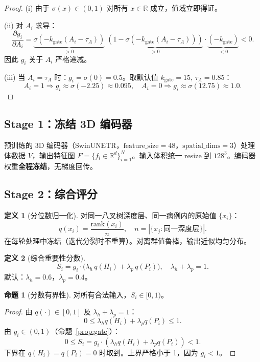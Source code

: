 \documentclass[11pt,a4paper]{article}
\newcommand{\RR}{\mathbb{R}}
\newcommand{\sigmoid}{\sigma}
\theoremstyle{definition}
\newtheorem{definition}{定义}[section]
\newtheorem{proposition}{命题}[section]
\begin{document}
\begin{proof}
(i) 由于 $\sigmoid(x) \in (0,1)$ 对所有 $x \in \RR$ 成立，值域立即得证。

(ii) 对 $A_i$ 求导：
\begin{equation}
\frac{\partial g_i}{\partial A_i}
= \underbrace{\sigmoid(-k_{\mathrm{gate}}(A_i-\tau_A))}_{>0}\;
  \underbrace{(1 - \sigmoid(-k_{\mathrm{gate}}(A_i-\tau_A)))}_{>0}
  \cdot \underbrace{(-k_{\mathrm{gate}})}_{<0} < 0.
\end{equation}
因此 $g_i$ 关于 $A_i$ 严格递减。

(iii) 当 $A_i=\tau_A$ 时：$g_i=\sigmoid(0)=0.5$。取默认值 $k_{\mathrm{gate}}=15,\,\tau_A=0.85$：
\[
A_i=1 \Rightarrow g_i \approx \sigmoid(-2.25) \approx 0.095, \quad
A_i=0 \Rightarrow g_i \approx \sigmoid(12.75) \approx 1.0.
\]
\end{proof}


\subsection{Stage 1：冻结 3D 编码器}

预训练的 3D 编码器（SwinUNETR，$\mathrm{feature\_size}=48$，$\mathrm{spatial\_dims}=3$）处理体数据 $V$，输出特征图 $F = \{f_i \in \RR^d\}_{i=1}^{N}$。输入体积统一 resize 到 $128^3$。编码器权重\textbf{全程冻结}，无梯度回传。


\subsection{Stage 2：综合评分}

\begin{definition}[分位数归一化]
对同一八叉树深度层、同一病例内的原始值 $\{x_i\}$：
\begin{equation}
q(x_i) = \frac{\mathrm{rank}(x_i)}{n}, \quad n = |\{x_j : \text{同一深度层}\}|.
\end{equation}
在每轮处理中冻结（迭代分裂时不重算）。对离群值鲁棒，输出近似均匀分布。
\end{definition}

\begin{definition}[综合重要性分数]
\begin{equation}\label{eq:score}
S_i = g_i \cdot \big(\lambda_h \, q(H_i) + \lambda_p \, q(P_i)\big), \quad \lambda_h + \lambda_p = 1.
\end{equation}
默认：$\lambda_h = 0.6$，$\lambda_p = 0.4$。
\end{definition}

\begin{proposition}[分数有界性]\label{prop:score}
对所有合法输入，$S_i \in [0, 1)$。
\end{proposition}
\begin{proof}
由 $q(\cdot) \in [0,1]$ 及 $\lambda_h + \lambda_p = 1$：
\[
0 \leq \lambda_h q(H_i) + \lambda_p q(P_i) \leq 1.
\]
由 $g_i \in (0,1)$（命题~\ref{prop:gate}）：
\[
0 \leq S_i = g_i \cdot (\lambda_h q(H_i) + \lambda_p q(P_i)) < 1.
\]
下界在 $q(H_i)=q(P_i)=0$ 时取到。上界严格小于 1，因为 $g_i < 1$。
\end{proof}
\end{document}
